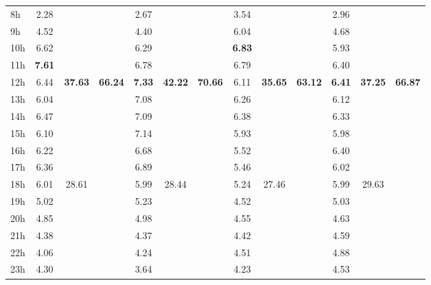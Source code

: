 \documentclass[%
 aip,
 jmp,%
 amsmath,amssymb,
 reprint,%
]{revtex4-1}
\begin{document}
\begin{table}
\begin{center}
\begin{tabular}{ |l|| c|c|c| c|c|c| c|c|c| c|c|c|}
8h  & 2.28 &                        &                         & 2.67  & & & 3.54 & & & 2.96 & & \\
9h  & 4.52 &                        &                         & 4.40  & & & 6.04 & & & 4.68 & & \\
10h & 6.62 &                        &                         & 6.29  & & & {\bf 6.83} & & & 5.93 & & \\
11h & {\bf 7.61} &                        &                         & 6.78  & & & 6.79 & & & 6.40 & & \\\hline
12h & 6.44 & \multirow{6}{*}{\bf 37.63} & \multirow{12}{*}{\bf 66.24} & {\bf 7.33}  & \multirow{6}{*}{\bf 42.22} & \multirow{12}{*}{ \bf 70.66} & 6.11 & \multirow{6}{*}{\bf 35.65} &  \multirow{12}{*}{ \bf 63.12} & {\bf 6.41} & \multirow{6}{*}{\bf 37.25} &  \multirow{12}{*}{\bf 66.87} \\
13h & 6.04 &                        &                         & 7.08  & & & 6.26 & & & 6.12 & & \\
14h & 6.47 &                        &                         & 7.09  & & & 6.38 & & & 6.33 & & \\
15h & 6.10 &                        &                         & 7.14  & & & 5.93 & & & 5.98 & & \\
16h & 6.22 &                        &                         & 6.68  & & & 5.52 & & & 6.40 & & \\
17h & 6.36 &                        &                         & 6.89  & & & 5.46 & & & 6.02 & & \\\cline{3-3}\cline{6-6}\cline{9-9}\cline{12-12}


18h & 6.01 & \multirow{6}{*}{28.61} &                         & 5.99  & \multirow{6}{*}{28.44} & & 5.24 & \multirow{6}{*}{27.46} & & 5.99 & \multirow{6}{*}{29.63} & \\
19h & 5.02 &                        &                         & 5.23  & & & 4.52 & & & 5.03 & & \\
20h & 4.85 &                        &                         & 4.98  & & & 4.55 & & & 4.63 & & \\
21h & 4.38 &                        &                         & 4.37  & & & 4.42 & & & 4.59 & & \\
22h & 4.06 &                        &                         & 4.24  & & & 4.51 & & & 4.88 & & \\
23h & 4.30 &                        &                         & 3.64  & & & 4.23 & & & 4.53 & & \\\hline
    \end{tabular}
\end{center}
\label{dia}
\end{table}
\end{document}
